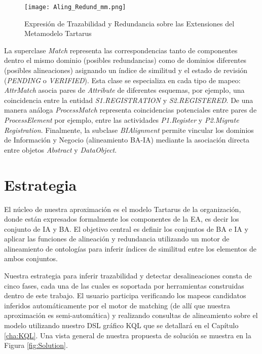 

\begin{figure} [!t]
\begin{center}
	\texttt{[image: Aling\_Redund\_mm.png]}
	\caption{Expresi\'on de Trazabilidad y Redundancia sobre las Extensiones del Metamodelo Tartarus}
	\label{fig:Aling_Redund_mm}
\end{center}
\end{figure}

La superclase \textit{Match} representa las correspondencias tanto de componentes dentro el mismo dominio (posibles redundancias) como de dominios diferentes (posibles alineaciones) asignando un \'indice de similitud y el estado de revisi\'on (\textit{PENDING} o \textit{VERIFIED}). Esta clase se especializa en cada tipo de mapeo: \textit{AttrMatch} asocia pares de \textit{Attribute} de diferentes esquemas, por ejemplo, una coincidencia entre la entidad \textit{S1.REGISTRATION} y \textit{S2.REGISTERED}. De una manera an\'aloga \textit{ProcessMatch} representa coincidencias potenciales entre pares de \textit{ProcessElement} por ejemplo, entre las actividades \textit{P1.Register} y \textit{P2.Migrate Registration}. Finalmente, la subclase \textit{BIAlignment} permite vincular los dominios de Informaci\'on y Negocio (alineamiento BA-IA) mediante la asociaci\'on directa entre objetos \textit{Abstract} y \textit{DataObject}.


\section{Estrategia}

El n\'ucleo de nuestra aproximaci\'on es el modelo Tartarus de la organizaci\'on, donde est\'an expresados formalmente los componentes de la EA, es decir los conjunto de IA y BA. El objetivo central es definir los conjuntos de BA e IA y aplicar las funciones de alineaci\'on y redundancia utilizando un motor de alineamiento de ontolog\'ias para inferir \'indices de similitud entre los elementos de ambos conjuntos.

Nuestra estrategia para inferir trazabilidad y detectar desalineaciones consta de cinco fases, cada una de las cuales es soportada por herramientas construidas dentro de este trabajo. El usuario participa verificando los mapeos candidatos inferidos autom\'aticamente por el motor de matching (de all\'i que nuestra aproximaci\'on es semi-autom\'atica) y realizando consultas de alineamiento sobre el modelo utilizando nuestro DSL gr\'afico KQL que se detallar\'a en el Cap\'itulo \ref{cha:KQL}. Una vista general de nuestra propuesta de soluci\'on se muestra en la Figura \ref{fig:Solution}.

